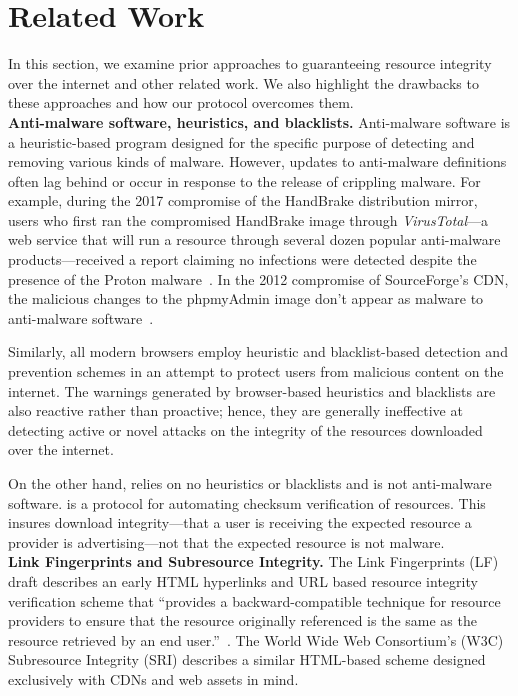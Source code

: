 \section{Related Work} \label{sec:related}

In this section, we examine prior approaches to guaranteeing resource integrity
over the internet and other related work. We also highlight the drawbacks to
these approaches and how our protocol overcomes them. \\

\noindent\textbf{Anti-malware software, heuristics, and blacklists.}
Anti-malware software is a heuristic-based program designed for the specific
purpose of detecting and removing various kinds of malware. However, updates to
anti-malware definitions often lag behind or occur in response to the release of
crippling malware. For example, during the 2017 compromise of the HandBrake
distribution mirror, users who first ran the compromised HandBrake image through
\textit{VirusTotal}---a web service that will run a resource through several
dozen popular anti-malware products---received a report claiming no infections
were detected despite the presence of the Proton malware~\cite{SCA-HB1}. In the
2012 compromise of SourceForge's CDN, the malicious changes to the phpmyAdmin
image don't appear as malware to anti-malware software~\cite{SCA-PMA1}.

Similarly, all modern browsers employ heuristic and blacklist-based detection
and prevention schemes in an attempt to protect users from malicious content on
the internet. The warnings generated by browser-based heuristics and blacklists
are also reactive rather than proactive; hence, they are generally ineffective
at detecting active or novel attacks on the integrity of the resources
downloaded over the internet.

On the other hand, \SYSTEM{} relies on no heuristics or blacklists and is not
anti-malware software. \SYSTEM{} is a protocol for automating checksum
verification of resources. This insures download integrity---that a user is
receiving the expected resource a provider is advertising---not that the
expected resource is not malware. \\

\noindent\textbf{Link Fingerprints and Subresource Integrity.} The Link
Fingerprints (LF) draft describes an early HTML hyperlinks and URL based
resource integrity verification scheme that ``provides a backward-compatible
technique for resource providers to ensure that the resource originally
referenced is the same as the resource retrieved by an end user.''~\cite{LF}.
The World Wide Web Consortium's (W3C) Subresource Integrity (SRI) describes a
similar HTML-based scheme designed exclusively with CDNs and web assets in mind.

